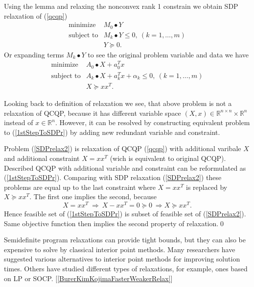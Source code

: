 \documentclass[10pt,oneside]{book}
\theoremstyle{definition}
\begin{document}
Using the lemma and relaxing the nonconvex rank 1 constrain we obtain SDP relaxation of (\ref{qcqp})
\begin{equation} 
\label{SDPrelax1}
\begin{array}{ll}
\mbox{minimize}& M_0\bullet Y \\
\mbox{subject to}& M_k\bullet Y \leq 0, \  (k = 1,\dots ,m)\\
& Y\succeq 0.
\end{array} 
\end{equation}
Or expanding terms $M_k\bullet Y$ to see the original problem variable and data we have
\begin{equation}
\label{SDPrelax2} 
\begin{array}{ll}
\mbox{minimize}& A_0\bullet X + a_0^Tx \\
\mbox{subject to}& A_k\bullet X+ a_k^Tx + \alpha_k \leq 0, \  (k = 1,\dots ,m)\\
& X\succeq xx^T.
\end{array} 
\end{equation}

Looking back to definition of relaxation we see, that above problem is not a relaxation of QCQP, because it has different variable space $(X,x)\in \mathbb{R}^{n\times n}\times \mathbb{R}^n$ instead of $x\in \mathbb{R}^n$. However, it can be resolved by constructing equivalent problem to (\ref{1stStepToSDPr}) by adding new redundant variable and constraint.
 
\prop Problem (\ref{SDPrelax2}) is relaxation of QCQP (\ref{qcqp}) with additional varibale $X$ and additional constraint $X=xx^T$ (wich is equivalent to original QCQP).
\proof Described QCQP with additional variable and constraint can be reformulated as (\ref{1stStepToSDPr}). Comparing with SDP relaxation (\ref{SDPrelax2}) these problems are equal up to the last constraint where $X=xx^T$ is replaced by $X\succeq xx^T$. The first one implies the second, because $$X=xx^T \ \Rightarrow \ X-xx^T = 0 \succeq 0 \ \Rightarrow X\succeq xx^T.$$  Hence feasible set of (\ref{1stStepToSDPr}) is subset of feasible set of (\ref{SDPrelax2}). Same objective function then implies the second property of relaxation.\qed   

\bigskip 

Semidefinite program relaxations can provide tight bounds, but they can also be expensive to solve by classical interior point methods.
Many researchers have suggested various alternatives to interior point methods for improving solution times. Others have studied different types of relaxations, for example, ones based on LP or SOCP. [\ref{BurerKimKojimaFasterWeakerRelax}]
\end{document}
